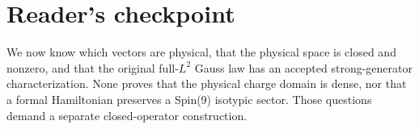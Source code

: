 \section{Reader's checkpoint}
We now know which vectors are physical, that the physical space is
closed and nonzero, and that the original full-$L^2$ Gauss law has an
accepted strong-generator characterization. None proves that the
physical charge domain is dense, nor that a formal Hamiltonian preserves
a Spin(9) isotypic sector. Those questions demand a separate
closed-operator construction.

